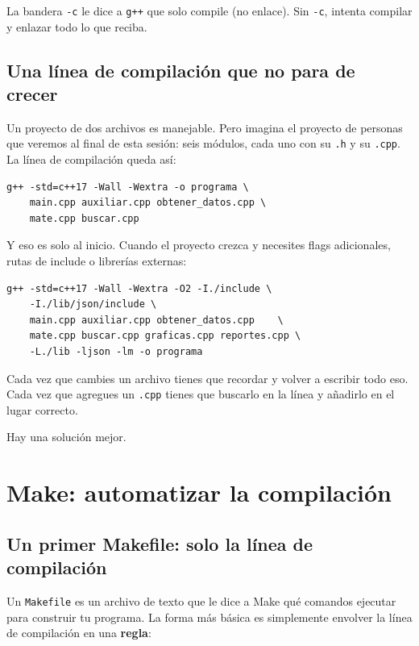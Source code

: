 \documentclass[12pt, oneside]{article}
\begin{document}
\begin{recuerda}
  La bandera \texttt{-c} le dice a \texttt{g++} que solo compile
  (no enlace).  Sin \texttt{-c}, intenta compilar y enlazar todo lo que
  reciba.
\end{recuerda}

\subsection{Una línea de compilación que no para de crecer}

Un proyecto de dos archivos es manejable.  Pero imagina el proyecto de
personas que veremos al final de esta sesión: seis módulos, cada uno con
su \texttt{.h} y su \texttt{.cpp}.  La línea de compilación queda así:

\begin{verbatim}
g++ -std=c++17 -Wall -Wextra -o programa \
    main.cpp auxiliar.cpp obtener_datos.cpp \
    mate.cpp buscar.cpp
\end{verbatim}

Y eso es solo al inicio.  Cuando el proyecto crezca y necesites flags
adicionales, rutas de include o librerías externas:

\begin{verbatim}
g++ -std=c++17 -Wall -Wextra -O2 -I./include \
    -I./lib/json/include \
    main.cpp auxiliar.cpp obtener_datos.cpp    \
    mate.cpp buscar.cpp graficas.cpp reportes.cpp \
    -L./lib -ljson -lm -o programa
\end{verbatim}

Cada vez que cambies un archivo tienes que recordar y volver a escribir
todo eso.  Cada vez que agregues un \texttt{.cpp} tienes que buscarlo
en la línea y añadirlo en el lugar correcto.

Hay una solución mejor.

\section{Make: automatizar la compilación}

\subsection{Un primer Makefile: solo la línea de compilación}

Un \texttt{Makefile} es un archivo de texto que le dice a Make qué
comandos ejecutar para construir tu programa.  La forma más básica es
simplemente envolver la línea de compilación en una \textbf{regla}:
\end{document}
